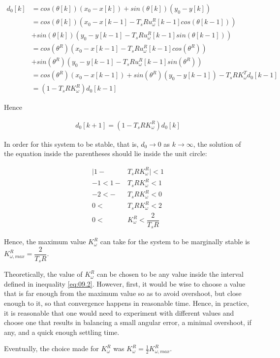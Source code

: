 \begin{align*}
  d_0[k] &= cos(\theta[k]) (x_0 - x[k]) + sin(\theta[k]) (y_0 - y[k]) \\
         &= cos(\theta[k]) (x_0 - x[k-1] - T_s R u_{\omega}^R[k-1] cos(\theta[k-1])) \\
         &+ sin(\theta[k]) (y_0 - y[k-1] - T_s R u_{\omega}^R[k-1] sin(\theta[k-1])) \\
         &= cos(\theta^R) (x_0 - x[k-1] - T_s R u_{\omega}^R[k-1] cos(\theta^R)) \\
         &+ sin(\theta^R) (y_0 - y[k-1] - T_s R u_{\omega}^R[k-1] sin(\theta^R)) \\
         &= cos(\theta^R) (x_0 - x[k-1]) + sin(\theta^R) (y_0 - y[k-1]) -T_s R K_{\omega}^T d_0[k-1]  \\
         &= (1-T_s R K_{\omega}^R)d_0[k-1]
\end{align*}

Hence

\begin{align*}
  d_0[k+1]= (1-T_s R K_{\omega}^R)d_0[k]
\end{align*}

In order for this system to be stable, that is, $d_0 \to 0$ as $k \to \infty$,
the solution of the equation inside the parentheses should lie inside the unit
circle:

\begin{align}
  \Big|1 - &T_s R K_{\omega}^R\Big| < 1 \nonumber \\
  -1 < 1 - &T_s R K_{\omega}^R < 1 \nonumber \\
  -2 < - &T_s R K_{\omega}^R < 0 \nonumber \\
   0 <\ &T_s R K_{\omega}^R < 2 \nonumber \\
   0 <\ &K_{\omega}^R < \dfrac{2}{T_s R} \label{eq:09.2}
\end{align}

Hence, the maximum value $K_{\omega}^R$ can take for the system to be marginally
stable is $K_{\omega,max}^R = \dfrac{2}{T_s R}$.

Theoretically, the value of $K_{\omega}^R$ can be chosen to be any value inside
the interval defined in inequality \ref{eq:09.2}. However, first, it would be
wise to choose a value that is far enough from the maximum value so as to avoid
overshoot, but close enough to it, so that convergence happens in reasonable
time. Hence, in practice, it is reasonable that one would need to experiment
with different values and choose one that results in balancing a small angular
error, a minimal overshoot, if any, and a quick enough settling time.

Eventually, the choice made for $K_{\omega}^R$ was
$K_{\omega}^R = \frac{1}{2} K_{\omega,max}^R$.
